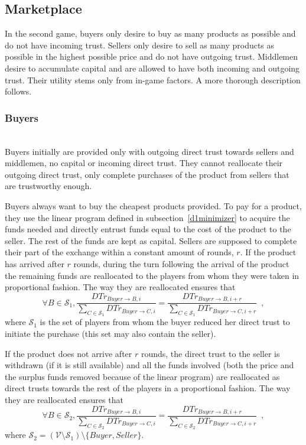 \subsection{Marketplace}
  In the second game, buyers only desire to buy as many products as possible and do not have incoming trust. Sellers only
  desire to sell as many products as possible in the highest possible price and do not have outgoing trust. Middlemen desire
  to accumulate capital and are allowed to have both incoming and outgoing trust. Their utility stems only from in-game
  factors. A more thorough description follows.

  \subsubsection{Buyers} \ \\

    Buyers initially are provided only with outgoing direct trust towards sellers and middlemen, no capital or incoming direct
    trust. They cannot reallocate their outgoing direct trust, only complete purchases of the product from sellers that are
    trustworthy enough.
    
    Buyers always want to buy the cheapest products provided. To pay for a product, they use the linear program defined in
    subsection~\ref{d1minimizer} to acquire the funds needed and directly entrust funds equal to the cost of the product to
    the seller. The rest of the funds are kept as capital. Sellers are supposed to complete their part of the exchange within
    a constant amount of rounds, $r$. If the product has arrived after $r$ rounds, during the turn following the arrival of
    the product the remaining funds are reallocated to the players from whom they were taken in proportional fashion. The way
    they are reallocated ensures that
    \begin{equation*}
      \forall B \in \mathcal{S}_1, \frac{DTr_{Buyer \rightarrow B, i}}{\sum\limits_{C \in \mathcal{S}_1}DTr_{Buyer \rightarrow
      C, i}} = \frac{DTr_{Buyer \rightarrow B, i + r}}{\sum\limits_{C \in \mathcal{S}_1}DTr_{Buyer \rightarrow C, i + r}}
      \enspace,
    \end{equation*}
    where $\mathcal{S}_1$ is the set of players from whom the buyer reduced her direct trust to initiate the purchase (this
    set may also contain the seller).

    If the product does not arrive after $r$ rounds, the direct trust to the seller is withdrawn (if it is still available)
    and all the funds involved (both the price and the surplus funds removed because of the linear program) are reallocated as
    direct trusts towards the rest of the players in a proportional fashion. The way they are reallocated ensures that
    \begin{equation*}
      \forall B \in \mathcal{S}_2, \frac{DTr_{Buyer \rightarrow B, i}}{\sum\limits_{C \in \mathcal{S}_2}DTr_{Buyer \rightarrow
      C, i}} = \frac{DTr_{Buyer \rightarrow B, i + r}}{\sum\limits_{C \in \mathcal{S}_2}DTr_{Buyer \rightarrow C, i + r}}
      \enspace,
    \end{equation*}
    where $\mathcal{S}_2 = \left(\mathcal{V} \setminus \mathcal{S}_1\right) \setminus{\{Buyer, Seller\}}$.

